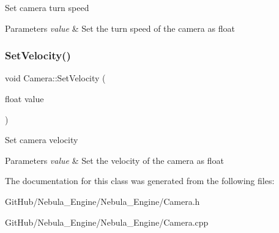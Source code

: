Set camera turn speed 
\begin{DoxyParams}{Parameters}
{\em value} & Set the turn speed of the camera as float \\
\hline
\end{DoxyParams}
\mbox{\label{class_camera_abbfbdc1eb2ffd6e250894b6d73bb6d1c}} 
\subsubsection{\texorpdfstring{SetVelocity()}{SetVelocity()}}
{\footnotesize\ttfamily void Camera\+::\+Set\+Velocity (\begin{DoxyParamCaption}\item[{float}]{value }\end{DoxyParamCaption})}

Set camera velocity 
\begin{DoxyParams}{Parameters}
{\em value} & Set the velocity of the camera as float \\
\hline
\end{DoxyParams}


The documentation for this class was generated from the following files\+:\begin{DoxyCompactItemize}
\item 
Git\+Hub/\+Nebula\+\_\+\+Engine/\+Nebula\+\_\+\+Engine/Camera.\+h\item 
Git\+Hub/\+Nebula\+\_\+\+Engine/\+Nebula\+\_\+\+Engine/Camera.\+cpp\end{DoxyCompactItemize}
